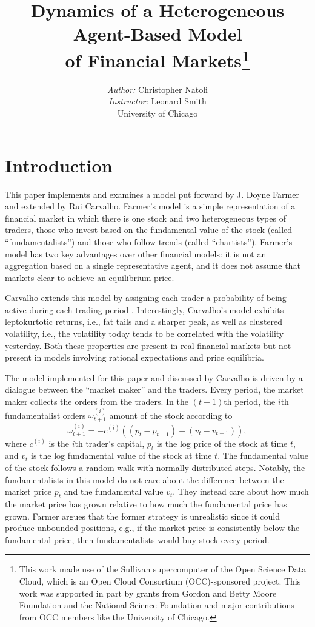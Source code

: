 \documentclass{article}
\title{\vspace{-20pt}Dynamics of a Heterogeneous Agent-Based Model\\of Financial Markets\thanks{This work made use of the Sullivan supercomputer of the Open Science Data Cloud, which is an Open Cloud Consortium (OCC)-sponsored project. This work was supported in part by grants from Gordon and Betty Moore Foundation and the National Science Foundation and major contributions from OCC members like the University of Chicago.}}
\author{\textit{Author:} Christopher Natoli\\
  \textit{Instructor:} Leonard Smith\\
  University of Chicago\\}
\date{}
\newcommand\prn[1]{\left( #1 \right)}
\begin{document}
\maketitle

\section{Introduction}

This paper implements and examines a model put forward by J. Doyne Farmer and extended by Rui Carvalho. Farmer's model \cite{farmer} is a simple representation of a financial market in which there is one stock and two heterogeneous types of traders, those who invest based on the fundamental value of the stock (called ``fundamentalists'') and those who follow trends (called ``chartists''). Farmer's model has two key advantages over other financial models: it is not an aggregation based on a single representative agent, and it does not assume that markets clear to achieve an equilibrium price.

Carvalho extends this model by assigning each trader a probability of being active during each trading period \cite{carvalho}. Interestingly, Carvalho's model exhibits leptokurtotic returns, i.e., fat tails and a sharper peak, as well as clustered volatility, i.e., the volatility today tends to be correlated with the volatility yesterday. Both these properties are present in real financial markets but not present in models involving rational expectations and price equilibria.

The model implemented for this paper and discussed by Carvalho is driven by a dialogue between the ``market maker'' and the traders. Every period, the market maker collects the orders from the traders. In the $(t+1)$th period, the $i$th fundamentalist orders $\omega_{t+1}^{(i)}$ amount of the stock according to
$$
\omega_{t+1}^{(i)}=-c^{(i)}\prn{(p_t-p_{t-1})-(v_t-v_{t-1})}
,$$
where $c^{(i)}$ is the $i$th trader's capital, $p_t$ is the log price of the stock at time $t$, and $v_t$ is the log fundamental value of the stock at time $t$. The fundamental value of the stock follows a random walk with normally distributed steps. Notably, the fundamentalists in this model do not care about the difference between the market price $p_t$ and the fundamental value $v_t$. They instead care about how much the market price has grown relative to how much the fundamental price has grown. Farmer argues that the former strategy is unrealistic since it could produce unbounded positions, e.g., if the market price is consistently below the fundamental price, then fundamentalists would buy stock every period.
\end{document}

